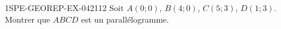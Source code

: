 \begin{exercice}{1SPE-GEOREP-EX-042}{1}{12}
Soit $A(0 ; 0)$, $B(4 ; 0)$, $C(5 ; 3)$, $D(1 ; 3)$. Montrer que $ABCD$ est un parallélogramme.
\end{exercice}
